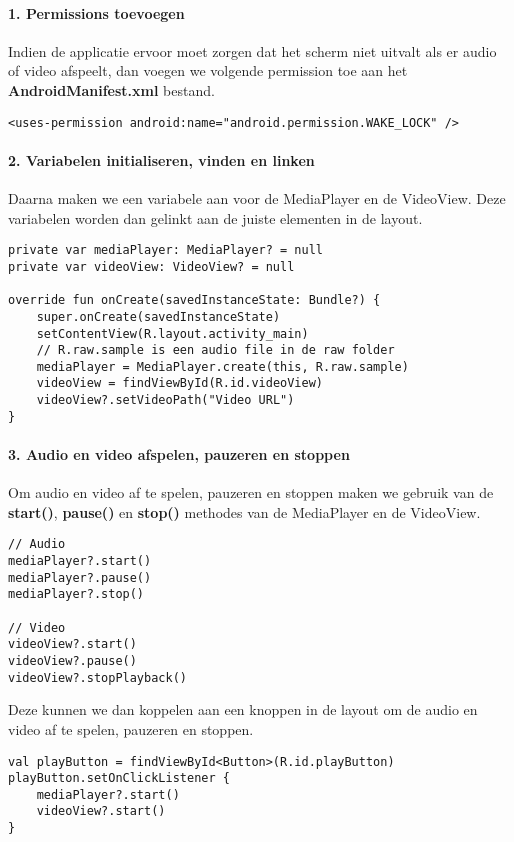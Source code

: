 \paragraph{1. Permissions toevoegen}
Indien de applicatie ervoor moet zorgen dat het scherm niet uitvalt als er 
audio of video afspeelt, dan voegen we volgende permission toe aan het 
\textbf{AndroidManifest.xml} bestand.
\begin{verbatim}
<uses-permission android:name="android.permission.WAKE_LOCK" />
\end{verbatim}

\paragraph{2. Variabelen initialiseren, vinden en linken}
Daarna maken we een variabele aan voor de MediaPlayer en de VideoView. Deze 
variabelen worden dan gelinkt aan de juiste elementen in de layout.
\begin{verbatim}
private var mediaPlayer: MediaPlayer? = null
private var videoView: VideoView? = null

override fun onCreate(savedInstanceState: Bundle?) {
    super.onCreate(savedInstanceState)
    setContentView(R.layout.activity_main)
    // R.raw.sample is een audio file in de raw folder
    mediaPlayer = MediaPlayer.create(this, R.raw.sample)
    videoView = findViewById(R.id.videoView)
    videoView?.setVideoPath("Video URL")
}
\end{verbatim}

\paragraph{3. Audio en video afspelen, pauzeren en stoppen}
Om audio en video af te spelen, pauzeren en stoppen maken we gebruik van de
\textbf{start()}, \textbf{pause()} en \textbf{stop()} methodes van de
MediaPlayer en de VideoView.
\begin{verbatim}
// Audio
mediaPlayer?.start()
mediaPlayer?.pause()
mediaPlayer?.stop()

// Video
videoView?.start()
videoView?.pause()
videoView?.stopPlayback()
\end{verbatim}
Deze kunnen we dan koppelen aan een knoppen in de layout om de audio en video
af te spelen, pauzeren en stoppen.
\begin{verbatim}
val playButton = findViewById<Button>(R.id.playButton)
playButton.setOnClickListener {
    mediaPlayer?.start()
    videoView?.start()
}
\end{verbatim}

